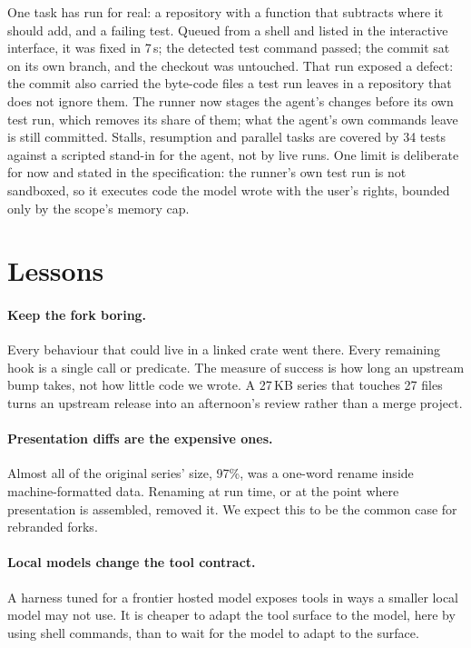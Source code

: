 \documentclass[11pt]{article}
\begin{document}
One task has run for real: a repository with a function that subtracts where it should add, and
a failing test. Queued from a shell and listed in the interactive interface, it was fixed in 7\,s;
the detected test command passed; the commit sat on its own branch, and the checkout was
untouched. That run exposed a defect: the commit also carried the byte-code files a test run leaves in a
repository that does not ignore them. The runner now stages the agent's changes before its own
test run, which removes its share of them; what the agent's own commands leave is still committed. Stalls, resumption and parallel tasks are covered by 34 tests
against a scripted stand-in for the agent, not by live runs. One limit is deliberate for now and
stated in the specification: the runner's own test run is not sandboxed, so it executes code the
model wrote with the user's rights, bounded only by the scope's memory cap.

\section{Lessons}
\label{sec:lessons}

\paragraph{Keep the fork boring.} Every behaviour that could live in a linked crate went there.
Every remaining hook is a single call or predicate. The measure of success is how long an upstream
bump takes, not how little code we wrote. A 27\,KB series that touches 27 files turns an upstream
release into an afternoon's review rather than a merge project.

\paragraph{Presentation diffs are the expensive ones.} Almost all of the original series' size, 97\%,
was a one-word rename inside machine-formatted data. Renaming at run time, or at the point where
presentation is assembled, removed it. We expect this to be the common case for rebranded forks.

\paragraph{Local models change the tool contract.} A harness tuned for a frontier hosted model
exposes tools in ways a smaller local model may not use. It is cheaper to adapt the tool surface to
the model, here by using shell commands, than to wait for the model to adapt to the surface.
\end{document}
